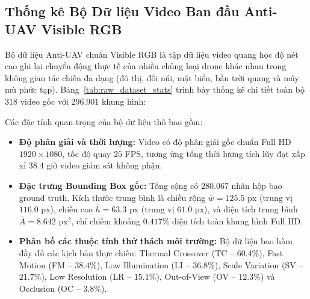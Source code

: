 \documentclass[11pt,a4paper]{article}
\begin{document}
\subsection{Thống kê Bộ Dữ liệu Video Ban đầu Anti-UAV Visible RGB}
Bộ dữ liệu Anti-UAV chuẩn Visible RGB là tập dữ liệu video quang học độ nét cao ghi lại chuyển động thực tế của nhiều chủng loại drone khác nhau trong không gian tác chiến đa dạng (đô thị, đồi núi, mặt biển, bầu trời quang và mây mù phức tạp). Bảng~\ref{tab:raw_dataset_stats} trình bày thống kê chi tiết toàn bộ $318$ video gốc với $296.901$ khung hình:

\begin{table}[htbp]
\centering
\caption{Thống kê định lượng toàn diện bộ dữ liệu video thô Anti-UAV Visible RGB.}
\label{tab:raw_dataset_stats}
\end{table}

Các đặc tính quan trọng của bộ dữ liệu thô bao gồm:
\begin{itemize}
    \item \textbf{Độ phân giải và thời lượng:} Video có độ phân giải gốc chuẩn Full HD $1920 \times 1080$, tốc độ quay $25$ FPS, tương ứng tổng thời lượng tích lũy đạt xấp xỉ $38.4$ giờ video giám sát không phận.
    \item \textbf{Đặc trưng Bounding Box gốc:} Tổng cộng có $280.067$ nhãn hộp bao ground truth. Kích thước trung bình là chiều rộng $\bar{w} = 125.5\text{ px}$ (trung vị $116.0\text{ px}$), chiều cao $\bar{h} = 63.3\text{ px}$ (trung vị $61.0\text{ px}$), và diện tích trung bình $\bar{A} = 8.642\text{ px}^2$, chỉ chiếm khoảng $0.417\%$ diện tích toàn khung hình Full HD.
    \item \textbf{Phân bố các thuộc tính thử thách môi trường:} Bộ dữ liệu bao hàm đầy đủ các kịch bản thực chiến: Thermal Crossover (TC -- $60.4\%$), Fast Motion (FM -- $38.4\%$), Low Illumination (LI -- $36.8\%$), Scale Variation (SV -- $21.7\%$), Low Resolution (LR -- $15.1\%$), Out-of-View (OV -- $12.3\%$) và Occlusion (OC -- $3.8\%$).
\end{itemize}
\end{document}
